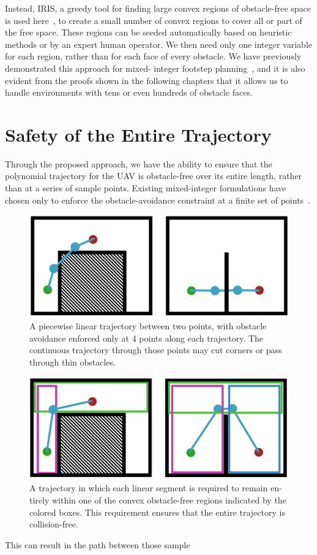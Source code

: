 Instead, IRIS, a greedy
tool for finding large convex regions of obstacle-free space is used here~\cite{deits2015computing}, to create a small number of convex regions to cover
all or part of the free space. These regions can be seeded
automatically based on heuristic methods or by an expert
human operator. We then need only one integer variable
for each region, rather than for each face of every obstacle.
We have previously demonstrated this approach for mixed-
integer footstep planning~\cite{deits2014footstep}, and it is also evident from the proofs shown in the following chapters that it
allows us to handle environments with tens or even hundreds
of obstacle faces.

\section{Safety of the Entire Trajectory}
Through the proposed approach, we have the ability to ensure that the
polynomial trajectory for the UAV is obstacle-free over its
entire length, rather than at a series of sample points. Existing
mixed-integer formulations have chosen only to enforce the
obstacle-avoidance constraint at a finite set of points~\cite{mellinger2012mixed,schouwenaars2001mixed,richards2002aircraft}. \begin{figure}[t]
	\includegraphics[width=0.9\linewidth]{fig_2}
	\centering
	\caption{\label{fig: cornercutting_1}A piecewise linear trajectory between two points, with obstacle
		avoidance enforced only at 4 points along each trajectory. The continuous
		trajectory through those points may cut corners or pass through thin
		obstacles.}
\end{figure}\begin{figure}[t]
\includegraphics[width=0.9\linewidth]{fig_3}
\centering
\caption{\label{fig: cornercutting_2}A trajectory in which each linear segment is required to remain en-
	tirely within one of the convex obstacle-free regions indicated by the colored
	boxes. This requirement ensures that the entire trajectory is collision-free.}
\end{figure}This can result in the path between those sample
